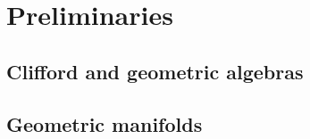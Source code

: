 \documentclass[doctor]{thesis}
\begin{document}

\chapter{Preliminaries}

\section{Clifford and geometric algebras}
\label{subsec:clifford_and_geometric_algebras}


\section{Geometric manifolds}
\label{sec:geometric_manifolds}




%
%
%
%
%
%


\end{document}
